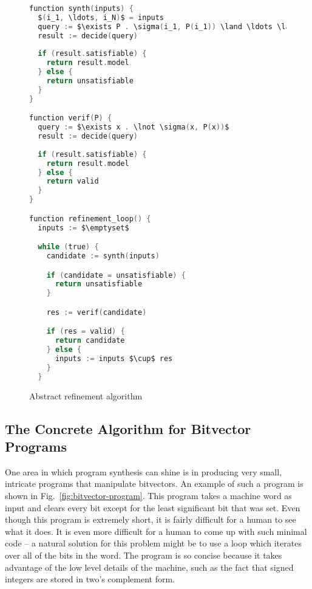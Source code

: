 \documentclass[a4paper]{llncs}
\begin{document}
\begin{figure}
\centering
\begin{minipage}{0.9\textwidth}
 \begin{lstlisting}[mathescape,language=C]
function synth(inputs) {
  $(i_1, \ldots, i_N)$ = inputs
  query := $\exists P . \sigma(i_1, P(i_1)) \land \ldots \land \sigma(i_N, P(i_N))$
  result := decide(query)
  
  if (result.satisfiable) {
    return result.model
  } else {
    return unsatisfiable
  }
}

function verif(P) {
  query := $\exists x . \lnot \sigma(x, P(x))$
  result := decide(query)
  
  if (result.satisfiable) {
    return result.model
  } else {
    return valid
  }
}

function refinement_loop() {
  inputs := $\emptyset$

  while (true) {
    candidate := synth(inputs)

    if (candidate = unsatisfiable) {
      return unsatisfiable
    }

    res := verif(candidate)

    if (res = valid) {
      return candidate
    } else {
      inputs := inputs $\cup$ res
    }
  }
 \end{lstlisting}
 \end{minipage}

 \label{fig:abstract-refinement-code}
 \caption{Abstract refinement algorithm}
\end{figure}

\subsection{The Concrete Algorithm for Bitvector Programs}

One area in which program synthesis can shine is in producing very small,
intricate programs that manipulate bitvectors.  An example of such a program
is shown in Fig.~\ref{fig:bitvector-program}.  This program takes a machine word
as input and clears every bit except for the least significant bit that was set.
Even though this program is extremely short, it is fairly difficult for a human
to see what it does.  It is even more difficult for a human to come up with such
minimal code -- a natural solution for this problem might be to use a loop which
iterates over all of the bits in the word.  The program is so concise because it
takes advantage of the low level details of the machine, such as the fact that
signed integers are stored in two's complement form.
\end{document}
